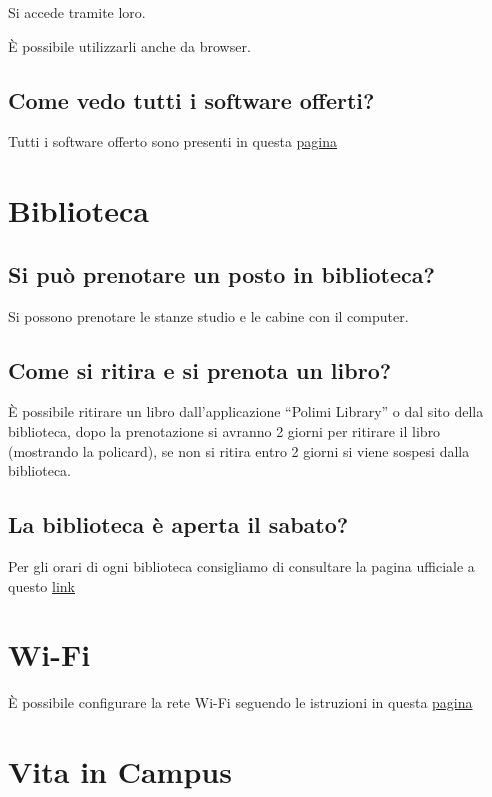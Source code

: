 \documentclass[legal]{polinetwork}
\begin{document}
Si accede tramite loro.

È possibile utilizzarli anche da browser.

\subsection{Come vedo tutti i software offerti?}


Tutti i software offerto sono presenti in questa \href{https://www.software.polimi.it/studenti/}{pagina}

\section{Biblioteca}


\subsection{Si può prenotare un posto in biblioteca?}


Si possono prenotare le stanze studio e le cabine con il computer.

\subsection{Come si ritira e si prenota un libro?}


È possibile ritirare un libro dall'applicazione ``Polimi Library'' o dal sito della biblioteca, dopo la prenotazione si avranno 2 giorni per ritirare il libro (mostrando la policard), se non si ritira entro 2 giorni si viene sospesi dalla biblioteca.


\subsection{La biblioteca è aperta il sabato?}


Per gli orari di ogni biblioteca consigliamo di consultare la pagina ufficiale a questo \href{https://www.polimi.it/campus-e-servizi/biblioteche-e-archivi/biblioteche}{link}

\section{Wi-Fi}


È possibile configurare la rete Wi-Fi seguendo le istruzioni in questa \href{https://www.ict.polimi.it/wifi/connessione-permanente/}{pagina}

\section{Vita in Campus}
\end{document}
